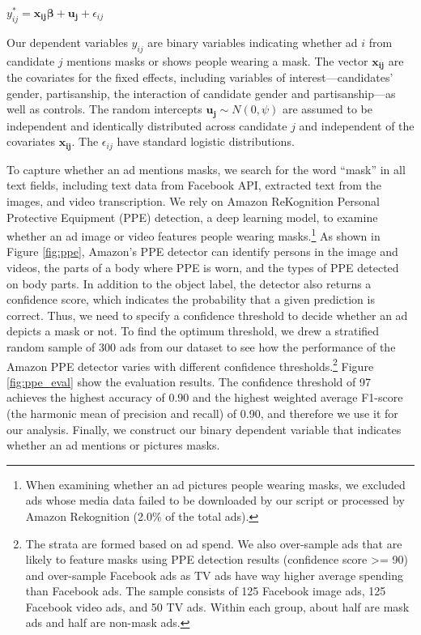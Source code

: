 \begin{center}
$y^{*}_{ij} = \boldsymbol{x_{ij}\beta} + \boldsymbol{u_{j}} +\epsilon_{ij}$
\end{center}

\noindent Our dependent variables $y_{ij}$ are binary variables indicating whether ad $i$ from candidate $j$ mentions masks or shows people wearing a mask. The vector $\boldsymbol{x_{ij}}$ are the covariates for the fixed effects, including variables of interest---candidates' gender, partisanship, the interaction of candidate gender and partisanship---as well as controls. The random intercepts $\boldsymbol{u_{j}} \sim N(0, \psi)$ are assumed to be independent and identically distributed across candidate $j$ and independent of the covariates $\boldsymbol{x_{ij}}$. The $\epsilon_{ij}$ have standard logistic distributions.

To capture whether an ad mentions masks, we search for the word ``mask'' in all text fields, including text data from Facebook API, extracted text from the images, and video transcription. We rely on Amazon ReKognition Personal Protective Equipment (PPE) detection, a deep learning model, to examine whether an ad image or video features people wearing masks.\footnote{When examining whether an ad pictures people wearing masks, we excluded ads whose media data failed to be downloaded by our script or processed by Amazon Rekognition (2.0\% of the total ads).} As shown in Figure \ref{fig:ppe}, Amazon's PPE detector can identify persons in the image and videos, the parts of a body where PPE is worn, and the types of PPE detected on body parts. In addition to the object label, the detector also returns a confidence score, which indicates the probability that a given prediction is correct. Thus, we need to specify a confidence threshold to decide whether an ad depicts a mask or not. To find the optimum threshold, we drew a stratified random sample of 300 ads from our dataset to see how the performance of the Amazon PPE detector varies with different confidence thresholds.\footnote{The strata are formed based on ad spend. We also over-sample ads that are likely to feature masks using PPE detection results (confidence score >= 90) and over-sample Facebook ads as TV ads have way higher average spending than Facebook ads. The sample consists of 125 Facebook image ads, 125 Facebook video ads, and 50 TV ads. Within each group, about half are mask ads and half are non-mask ads.} Figure \ref{fig:ppe_eval} show the evaluation results. The confidence threshold of 97 achieves the highest accuracy of 0.90 and the highest weighted average F1-score (the harmonic mean of precision and recall) of 0.90, and therefore we use it for our analysis. Finally, we construct our binary dependent variable that indicates whether an ad mentions or pictures masks.


